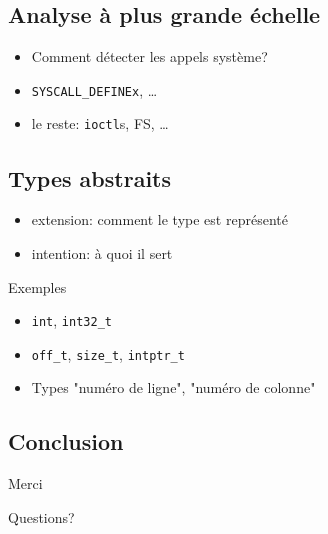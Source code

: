\documentclass{beamer}
\begin{document}
\subsection{Analyse à plus grande échelle}

\begin{frame}
    \begin{itemize}
        \item Comment détecter les appels système?
        \item \texttt{SYSCALL\_DEFINEx}, …
        \item le reste: \texttt{ioctl}s, FS, …
    \end{itemize}
\end{frame}

\subsection{Types abstraits}

\begin{frame}
    \begin{itemize}
        \item extension: comment le type est représenté
        \item intention: à quoi il sert
    \end{itemize}
\end{frame}

\begin{frame}{Exemples}
    \begin{itemize}
        \item \texttt{int}, \texttt{int32\_t}
        \item \texttt{off\_t}, \texttt{size\_t}, \texttt{intptr\_t}
        \item Types "numéro de ligne", "numéro de colonne"
    \end{itemize}
\end{frame}

\subsection{Conclusion}

\begin{frame}
    Merci

    Questions?
\end{frame}
\end{document}
